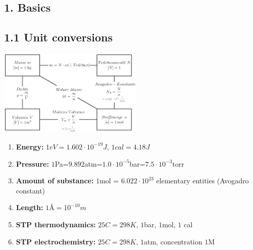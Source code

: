 




\begin{multicols*}{4}



\section{1. Basics}
\subsection{1.1 Unit conversions}{
    \centering
\includegraphics[width = 69mm]{Bilder/Zusammenhang.png}\\
\begin{enumerate}[noitemsep]
    \item \textbf{Energy:} $1eV=1.602\cdot 10^{-19}J$,    $1cal=4.18J$
    \item \textbf{Pressure:} $1$Pa=$9.892$atm=$1.0\cdot 10^{-5}$bar=$7.5\cdot 10^{-3}$torr
    \item \textbf{Amount of substance:} $1$mol = $6.022\cdot 10^{23}$ elementary entities (Avogadro constant)
    \item \textbf{Length:} $1\text{Å}=10^{-10}m$
    \item \textbf{STP thermodynamics: } $25C=298K$,  $1$bar,  $1$mol, $1$ cal
    \item \textbf{STP electrochemistry: } $25C=298K$,  $1$atm, concentration $1$M
\end{enumerate}
}



\end{multicols*}
